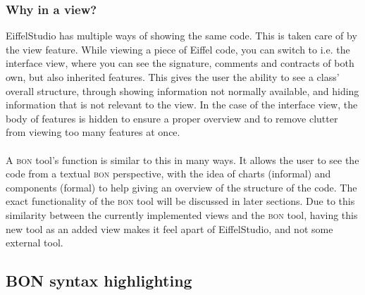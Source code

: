 \subsubsection{Why in a view?}
\label{why_a_view}
EiffelStudio has multiple ways of showing the same code. This is taken care of by the view feature. While viewing a piece of Eiffel code, you can switch to i.e. the interface view, where you can see the signature, comments and contracts of both own, but also inherited features. This gives the user the ability to see a class' overall structure, through showing information not normally available, and hiding information that is not relevant to the view. In the case of the interface view, the body of features is hidden to ensure a proper overview and to remove clutter from viewing too many features at once.
\paragraph{}
A \textsc{bon} tool's function is similar to this in many ways. It allows the user to see the code from a textual \textsc{bon} perspective, with the idea of charts (informal) and components (formal) to help giving an overview of the structure of the code. The exact functionality of the \textsc{bon} tool will be discussed in later sections. Due to this similarity between the currently implemented views and the \textsc{bon} tool, having this new tool as an added view makes it feel apart of EiffelStudio, and not some external tool.

\subsection{BON syntax highlighting}